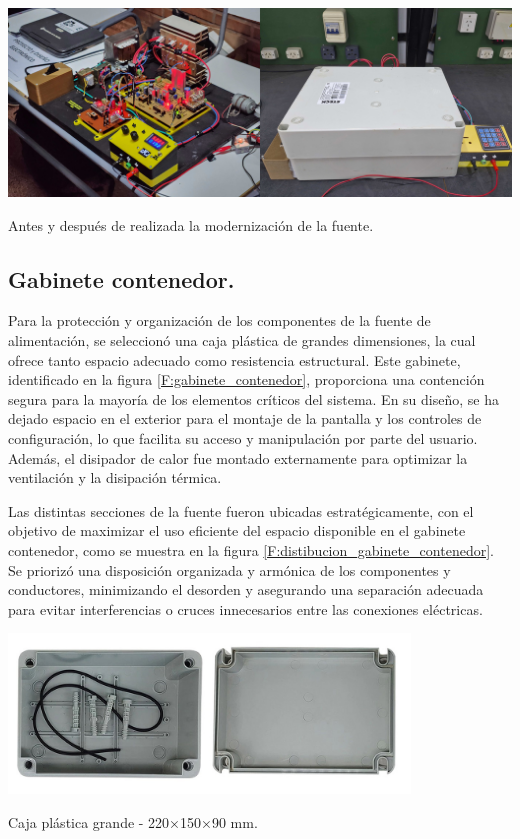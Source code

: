 \begin{foto}[H]
    \centering
    \includegraphics[scale=0.05]{./imagenes/fuente_anterior.jpg}
    \caption{Antes y después de realizada la modernización de la fuente.}
    \label{F:fuente_anterior}
\end{foto}

\subsection{Gabinete contenedor.}
Para la protección y organización de los componentes de la fuente de alimentación, se seleccionó una caja plástica de grandes dimensiones, la cual ofrece tanto espacio adecuado como resistencia estructural. Este gabinete, identificado en la figura \ref{F:gabinete_contenedor}, proporciona una contención segura para la mayoría de los elementos críticos del sistema. En su diseño, se ha dejado espacio en el exterior para el montaje de la pantalla y los controles de configuración, lo que facilita su acceso y manipulación por parte del usuario. Además, el disipador de calor fue montado externamente para optimizar la ventilación y la disipación térmica.\par
Las distintas secciones de la fuente fueron ubicadas estratégicamente, con el objetivo de maximizar el uso eficiente del espacio disponible en el gabinete contenedor, como se muestra en la figura \ref{F:distibucion_gabinete_contenedor}. Se priorizó una disposición organizada y armónica de los componentes y conductores, minimizando el desorden y asegurando una separación adecuada para evitar interferencias o cruces innecesarios entre las conexiones eléctricas.

\begin{foto}[H]
    \centering
    \includegraphics[width=0.8\textwidth]{./imagenes/caja_plastica.jpg}
    \caption{Caja plástica grande - 220×150×90 mm.}
    \label{F:gabinete_contenedor}
\end{foto}

